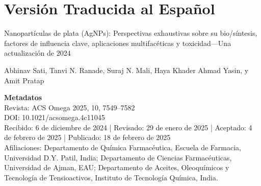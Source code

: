 \documentclass[pdflatex,sn-mathphys-num]{sn-jnl}
\begin{document}
\newpage
{}
\section*{Versión Traducida al Español}

\begin{center}
  {\LARGE Nanopartículas de plata (AgNPs): Perspectivas exhaustivas sobre su
    bio/síntesis, factores de influencia clave, aplicaciones multifacéticas y
  toxicidad---Una actualización de 2024 \par}
  \vspace{0.5cm}
  {\large Abhinav Sati, Tanvi N. Ranade, Suraj N. Mali, Haya Khader Ahmad Yasin,
  y Amit Pratap \par}
\end{center}

\vspace{0.5cm}
\noindent\textbf{Metadatos}\\
Revista: ACS Omega 2025, 10, 7549--7582 \\
DOI: 10.1021/acsomega.4c11045 \\
Recibido: 6 de diciembre de 2024 | Revisado: 29 de enero de 2025 |
Aceptado: 4 de febrero de 2025 | Publicado: 18 de febrero de 2025 \\
Afiliaciones: Departamento de Química Farmacéutica, Escuela de Farmacia,
Universidad D.Y. Patil, India; Departamento de Ciencias
Farmacéuticas, Universidad de Ajman, EAU; Departamento de
Aceites, Oleoquímicos y Tecnología de Tensioactivos, Instituto de Tecnología
Química, India.
\cite{satiSilverNanoparticlesAgNPs2025}
\end{document}
